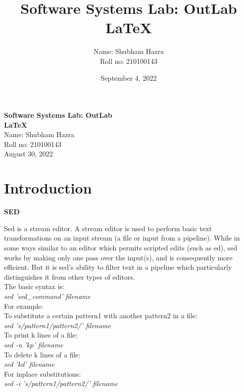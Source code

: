 \documentclass[12pt]{article}
\title{\textbf{Software Systems Lab: OutLab \\ \LaTeX{}}}
\author{Name: Shubham Hazra\\Roll no: 210100143}
\date{\Large{September 4, 2022}}
\begin{document}
\vspace*{20em}
\begin{center}
    \huge 
    \textbf{Software Systems Lab: OutLab}\\
    \vspace*{1em}
    \textbf{\LaTeX{}}\\
    \large
    \vspace*{1em}
    Name: Shubham Hazra\\
    Roll no: 210100143\\
    \vspace*{1em}
    \LARGE
    August 30, 2022
\end{center}

\newpage

\tableofcontents
\newpage

\section{Introduction}
\vspace*{4em}
\begin{center}
    {\Large{\textbf{SED}}}
\end{center}
\fbox
{
\begin{minipage}{\textwidth}
    Sed is a stream editor. A stream editor is used to perform basic text 
    transformations on an input stream (a file or input from a pipeline). 
    While in some ways similar to an editor which permits scripted edits 
    (such as ed), sed works by making only one pass over the input(s), and is 
    consequently more efficient. But it is sed’s ability to filter text in a 
    pipeline which particularly distinguishes it from other types of editors.
    \\
    The basic syntax is:\\
    \emph{sed 'sed\_command' filename}\\
    For example:\\ To substitute a certain pattern1 with another pattern2 in a file:\\
    \emph{sed 's/pattern1/pattern2/' filename}
    \\
    To print k lines of a file:\\
    \emph{sed -n 'kp' filename}\\
    To delete k lines of a file:\\
    \emph{sed 'kd' filename}\\
    For inplace substitutions:\\
    \emph{sed -i 's/pattern1/pattern2/' filename} \cite{geeksforgeeks1}
\end{minipage}
}\\\\\\\\
\end{document}
